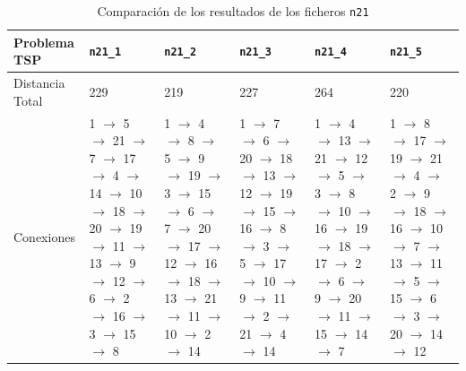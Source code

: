 \documentclass[a4paper,11pt]{article}
\begin{document}
\begin{table}[!htbp]
\label{results_100}
\centering
\begin{tabularx}{\textwidth}{|p{2cm}|X|X|X|X|X|}
\hline
Problema TSP	& \texttt{n21\_1}	& \texttt{n21\_2}	& \texttt{n21\_3}	& \texttt{n21\_4}	& \texttt{n21\_5} \\ \hline
Distancia Total    & 229    & 219   & 227   & 264   & 220	\\ \hline
Conexiones	& 1 $\to$ 5 $\to$ 21 $\to$ 7 $\to$ 17 $\to$ 4 $\to$ 14 $\to$ 10 $\to$ 18 $\to$ 20 $\to$ 19 $\to$ 11 $\to$ 13 $\to$ 9 $\to$ 12 $\to$ 6 $\to$ 2 $\to$ 16 $\to$ 3 $\to$ 15 $\to$ 8  & 1 $\to$ 4 $\to$ 8 $\to$ 5 $\to$ 9 $\to$ 19 $\to$ 3 $\to$ 15 $\to$ 6 $\to$ 7 $\to$ 20 $\to$ 17 $\to$ 12 $\to$ 16 $\to$ 18 $\to$ 13 $\to$ 21 $\to$ 11 $\to$ 10 $\to$ 2 $\to$ 14  & 1 $\to$ 7 $\to$ 6 $\to$ 20 $\to$ 18 $\to$ 13 $\to$ 12 $\to$ 19 $\to$ 15 $\to$ 16 $\to$ 8 $\to$ 3 $\to$ 5 $\to$ 17 $\to$ 10 $\to$ 9 $\to$ 11 $\to$ 2 $\to$ 21 $\to$ 4 $\to$ 14  & 1 $\to$ 4 $\to$ 13 $\to$ 21 $\to$ 12 $\to$ 5 $\to$ 3 $\to$ 8 $\to$ 10 $\to$ 16 $\to$ 19 $\to$ 18 $\to$ 17 $\to$ 2 $\to$ 6 $\to$ 9 $\to$ 20 $\to$ 11 $\to$ 15 $\to$ 14 $\to$ 7  & 1 $\to$ 8 $\to$ 17 $\to$ 19 $\to$ 21 $\to$ 4 $\to$ 2 $\to$ 9 $\to$ 18 $\to$ 16 $\to$ 10 $\to$ 7 $\to$ 13 $\to$ 11 $\to$ 5 $\to$ 15 $\to$ 6 $\to$ 3 $\to$ 20 $\to$ 14 $\to$ 12	\\ \hline
\end{tabularx}
\caption{Comparación de los resultados de los ficheros \texttt{n21}}
\end{table}
\end{document}
